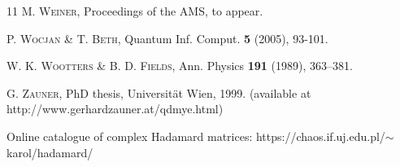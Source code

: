\documentclass[12pt]{amsart}
\numberwithin{equation}{section}
\theoremstyle{definition}
\theoremstyle{remark}
\theoremstyle{remark}
\begin{document}
\begin{thebibliography}{11}
\textsc{M. Weiner},
Proceedings of the AMS, to appear.

\textsc{P. Wocjan \& T. Beth},
Quantum Inf. Comput. {\bf 5} (2005), 93-101.


\textsc{W. K. Wootters \& B. D. Fields},
Ann. Physics {\bf 191} (1989), 363--381.

\textsc{G. Zauner},
PhD thesis, Universit\"at Wien, 1999. (available at
http://www.gerhardzauner.at/qdmye.html)

Online catalogue of complex Hadamard matrices: https://chaos.if.uj.edu.pl/$\sim$karol/hadamard/

\end{thebibliography}
\end{document}
